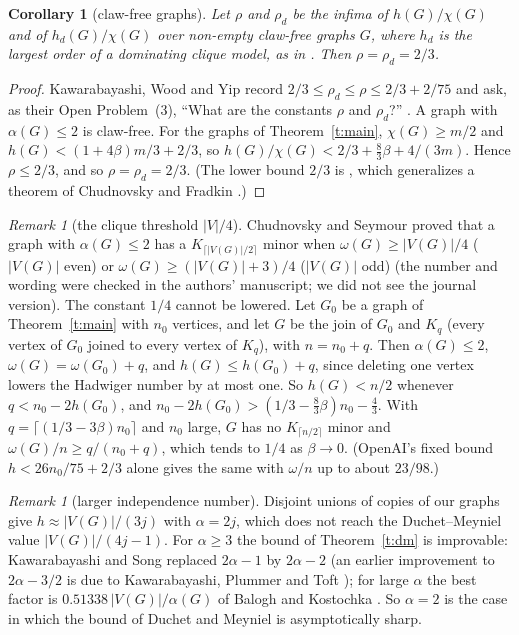 \documentclass[11pt]{article}
\newtheorem{corollary}[theorem]{Corollary}
\theoremstyle{definition}\newtheorem{conjecture}[theorem]{Conjecture}
\theoremstyle{remark}\newtheorem{remark}[theorem]{Remark}
\begin{document}
\begin{corollary}[claw-free graphs]\label{c:kwy}
Let $\rho$ and $\rho_d$ be the infima of $h(G)/\chi(G)$ and of $h_d(G)/\chi(G)$ over non-empty claw-free graphs $G$, where
$h_d$ is the largest order of a dominating clique model, as in \cite[Section~1.1]{KWY}. Then $\rho=\rho_d=2/3$.
\end{corollary}

\begin{proof}
Kawarabayashi, Wood and Yip record $2/3\le\rho_d\le\rho\le2/3+2/75$ and ask, as their Open Problem~(3), ``What are the
constants $\rho$ and $\rho_d$?'' \cite[Sections~1.1 and~7]{KWY}. A graph with $\alpha(G)\le2$ is claw-free. For the graphs of
Theorem~\ref{t:main}, $\chi(G)\ge m/2$ and $h(G)<(1+4\beta)m/3+2/3$, so $h(G)/\chi(G)<2/3+\tfrac83\beta+4/(3m)$. Hence
$\rho\le2/3$, and so $\rho=\rho_d=2/3$. (The lower bound $2/3$ is \cite[Theorem~5]{KWY}, which generalizes a theorem of
Chudnovsky and Fradkin \cite{CF}.)
\end{proof}

\begin{remark}[the clique threshold $|V|/4$]\label{r:cs}
Chudnovsky and Seymour \cite[Theorem~1.3]{CS} proved that a graph with $\alpha(G)\le2$ has a $K_{\lceil |V(G)|/2\rceil}$
minor when $\omega(G)\ge|V(G)|/4$ ($|V(G)|$ even) or $\omega(G)\ge(|V(G)|+3)/4$ ($|V(G)|$ odd) (the number and wording
were checked in the authors' manuscript; we did not see the journal version). The constant $1/4$ cannot be
lowered. Let $G_0$ be a graph of Theorem~\ref{t:main} with $n_0$ vertices, and let $G$ be the join of $G_0$ and $K_q$ (every
vertex of $G_0$ joined to every vertex of $K_q$), with $n=n_0+q$. Then $\alpha(G)\le2$, $\omega(G)=\omega(G_0)+q$, and
$h(G)\le h(G_0)+q$, since deleting one vertex lowers the Hadwiger number by at most one. So $h(G)<n/2$ whenever
$q<n_0-2h(G_0)$, and $n_0-2h(G_0)>(1/3-\tfrac83\beta)n_0-\tfrac43$. With $q=\lceil(1/3-3\beta)n_0\rceil$ and $n_0$ large,
$G$ has no $K_{\lceil n/2\rceil}$ minor and $\omega(G)/n\ge q/(n_0+q)$, which tends to $1/4$ as $\beta\to0$. (OpenAI's
fixed bound $h<26n_0/75+2/3$ alone gives the same with $\omega/n$ up to about $23/98$.)
\end{remark}

\begin{remark}[larger independence number]
Disjoint unions of copies of our graphs give $h\approx|V(G)|/(3j)$ with $\alpha=2j$, which does not reach the
Duchet--Meyniel value $|V(G)|/(4j-1)$. For $\alpha\ge3$ the bound of Theorem~\ref{t:dm} is improvable: Kawarabayashi and
Song replaced $2\alpha-1$ by $2\alpha-2$ \cite[Theorem~4.4]{Sey} (an earlier improvement to $2\alpha-3/2$ is due to
Kawarabayashi, Plummer and Toft \cite[Theorem~1.4]{KPT}); for large $\alpha$ the best factor is $0.51338\,|V(G)|/\alpha(G)$ of
Balogh and Kostochka \cite{BK}. So $\alpha=2$ is the case in which the bound of Duchet and Meyniel is asymptotically
sharp.
\end{remark}
\end{document}
